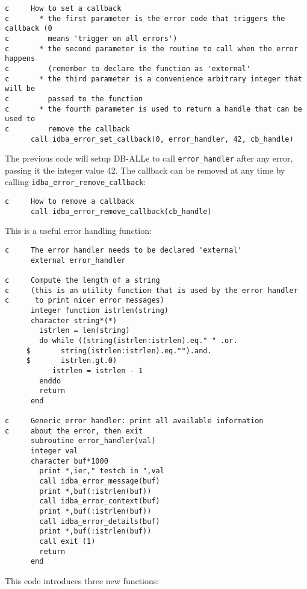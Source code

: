 \documentclass[final,12pt,a4paper,twoside]{book}
\begin{document}
\begin{verbatim}
c     How to set a callback
c       * the first parameter is the error code that triggers the callback (0
c         means 'trigger on all errors')
c       * the second parameter is the routine to call when the error happens        
c         (remember to declare the function as 'external'
c       * the third parameter is a convenience arbitrary integer that will be
c         passed to the function
c       * the fourth parameter is used to return a handle that can be used to
c         remove the callback
      call idba_error_set_callback(0, error_handler, 42, cb_handle)
\end{verbatim}

The previous code will setup DB-ALLe to call {\tt error\_handler} after any error,
passing it the integer value 42.  The callback can be removed at any time by
calling {\tt idba\_error\_remove\_callback}:
 
\begin{verbatim}
c     How to remove a callback
      call idba_error_remove_callback(cb_handle)
\end{verbatim}

This is a useful error handling function:

\begin{verbatim}
c     The error handler needs to be declared 'external'
      external error_handler

c     Compute the length of a string
c     (this is an utility function that is used by the error handler
c      to print nicer error messages)
      integer function istrlen(string)
      character string*(*)
        istrlen = len(string)
        do while ((string(istrlen:istrlen).eq." " .or.
     $       string(istrlen:istrlen).eq."").and.
     $       istrlen.gt.0)
           istrlen = istrlen - 1
        enddo
        return
      end

c     Generic error handler: print all available information
c     about the error, then exit
      subroutine error_handler(val)
      integer val
      character buf*1000
        print *,ier," testcb in ",val
        call idba_error_message(buf)
        print *,buf(:istrlen(buf))
        call idba_error_context(buf)
        print *,buf(:istrlen(buf))
        call idba_error_details(buf)
        print *,buf(:istrlen(buf))
        call exit (1)
        return
      end
\end{verbatim}

This code introduces three new functions:
\end{document}
